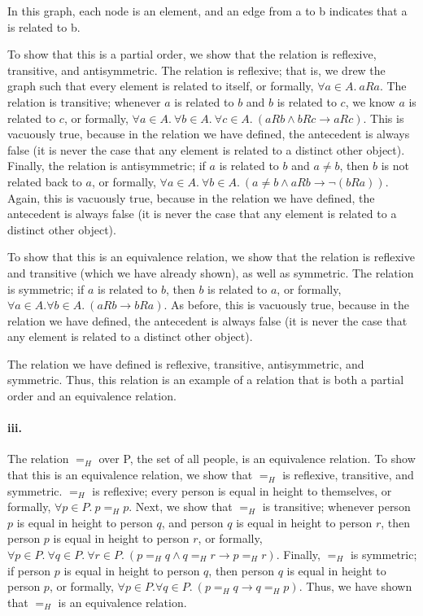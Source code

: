 \documentclass[10pt,letter]{article}
\begin{document}
In this graph, each node is an element, and an edge from a to b indicates that a is related to b. 

To show that this is a partial order, we show that the relation is reflexive, transitive, and antisymmetric. The relation is reflexive; that is, we drew the graph such that every element is related to itself, or formally, $\forall a \in A.\ aRa$. The relation is transitive; whenever $a$ is related to $b$ and $b$ is related to $c$, we know $a$ is related to $c$, or formally, $\forall a \in A.\ \forall b \in A.\ \forall c \in A.\ (aRb \wedge bRc \rightarrow aRc)$. This is vacuously true, because in the relation we have defined, the antecedent is always false (it is never the case that any element is related to a distinct other object). Finally, the relation is antisymmetric; if $a$ is related to $b$ and $a \neq b$, then $b$ is not related back to $a$, or formally, $\forall a \in A.\ \forall b \in A.\ (a \neq b \wedge aRb \rightarrow \neg(bRa))$. Again, this is vacuously true, because in the relation we have defined, the antecedent is always false (it is never the case that any element is related to a distinct other object).

To show that this is an equivalence relation, we show that the relation is reflexive and transitive (which we have already shown), as well as symmetric. The relation is symmetric; if $a$ is related to $b$, then $b$ is related to $a$, or formally, $\forall a \in A. \forall b \in A.\ (aRb \rightarrow bRa)$. As before, this is vacuously true, because in the relation we have defined, the antecedent is always false (it is never the case that any element is related to a distinct other object).  

The relation we have defined is reflexive, transitive, antisymmetric, and symmetric. Thus, this relation is an example of a relation that is both a partial order and an equivalence relation.

\paragraph{iii.} The relation $=_H$ over P, the set of all people, is an equivalence relation. To show that this is an equivalence relation, we show that $=_H$ is reflexive, transitive, and symmetric. $=_H$ is reflexive; every person is equal in height to themselves, or formally, $\forall p \in P.\ p =_H p$. Next, we show that $=_H$ is transitive; whenever person $p$ is equal in height to person $q$, and person $q$ is equal in height to person $r$, then person $p$ is equal in height to person $r$, or formally, $\forall p \in P.\ \forall q \in P.\ \forall r \in P.\ (p =_H q \wedge q =_H r \rightarrow p =_H r)$. Finally, $=_H$ is symmetric; if person $p$ is equal in height to person $q$, then person $q$ is equal in height to person $p$, or formally, $\forall p \in P. \forall q \in P.\ (p =_H q \rightarrow q =_H p)$. Thus, we have shown that $=_H$ is an equivalence relation.
\end{document}
